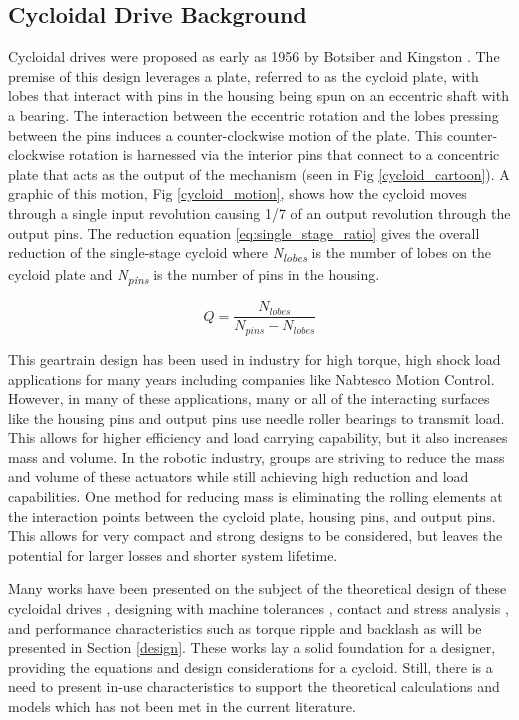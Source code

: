 \subsection{Cycloidal Drive Background}
Cycloidal drives were proposed as early as 1956 by Botsiber and Kingston \cite{1956}.
The premise of this design leverages a plate, referred to as the cycloid plate, with lobes that interact with pins in the housing being spun on an eccentric shaft with a bearing.
The interaction between the eccentric rotation and the lobes pressing between the pins induces a counter-clockwise motion of the plate. This counter-clockwise rotation is harnessed via the interior pins that connect to a concentric plate that acts as the output of the mechanism (seen in Fig \ref{cycloid_cartoon}). A graphic of this motion, Fig \ref{cycloid_motion}, shows how the cycloid moves through a single input revolution causing 1/7 of an output revolution through the output pins. 
The reduction equation \ref{eq:single_stage_ratio} gives the overall reduction of the single-stage cycloid where \textit{N\textsubscript{lobes}} is the number of lobes on the cycloid plate and \textit{N\textsubscript{pins}} is the number of pins in the housing. 

\begin{equation} \label{eq:single_stage_ratio}
Q = \frac{N_{lobes}} {N_{pins} - N_{lobes}}
\end{equation}

This geartrain design has been used in industry for high torque, high shock load applications for many years including companies like Nabtesco Motion Control.
However, in many of these applications, many or all of the interacting surfaces like the housing pins and output pins use needle roller bearings to transmit load.
This allows for higher efficiency and load carrying capability, but it also increases mass and volume.
In the robotic industry, groups are striving to reduce the mass and volume of these actuators while still achieving high reduction and load capabilities.
One method for reducing mass is eliminating the rolling elements at the interaction points between the cycloid plate, housing pins, and output pins.
This allows for very compact and strong designs to be considered, but leaves the potential for larger losses and shorter system lifetime.

Many works have been presented on the subject of the theoretical design of these cycloidal drives \cite{on_the_lobe} \cite{hwang_hsieh}, designing with machine tolerances \cite{design_and_application}, contact and stress analysis \cite{li}, and performance characteristics such as torque ripple and backlash \cite{hsieh_traditional} \cite{hsieh_dynamics} as will be presented in Section \ref{design}.
These works lay a solid foundation for a designer, providing the equations and design considerations for a cycloid.
Still, there is a need to present in-use characteristics to support the theoretical calculations and models which has not been met in the current literature.

